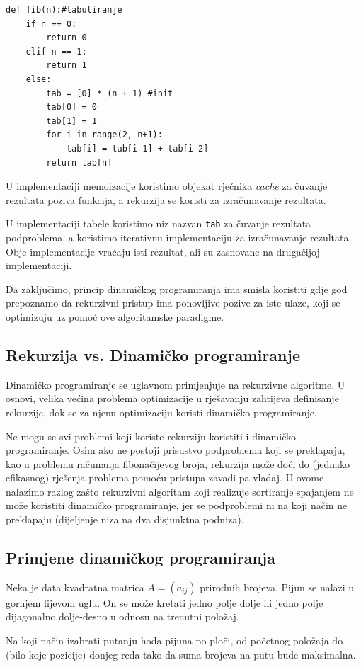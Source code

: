 \begin{verbatim}  
def fib(n):#tabuliranje
	if n == 0:
		return 0
	elif n == 1:
		return 1
	else:
		tab = [0] * (n + 1) #init
		tab[0] = 0
		tab[1] = 1
		for i in range(2, n+1):
			tab[i] = tab[i-1] + tab[i-2]
		return tab[n]
\end{verbatim}
U implementaciji memoizacije koristimo objekat rječnika \textit{cache} za čuvanje rezultata poziva funkcija, a rekurzija se koristi za izračunavanje rezultata.

U implementaciji tabele koristimo niz nazvan \texttt{tab} za čuvanje rezultata podproblema, a koristimo iterativnu implementaciju za izračunavanje rezultata. Obje implementacije vraćaju isti rezultat, ali su zasnovane na drugačijoj implementaciji. %

Da zaključimo, princip dinamičkog programiranja ima smisla koristiti gdje god prepoznamo da rekurzivni pristup ima ponovljive pozive za iste ulaze, koji se optimizuju uz pomoć ove algoritamske paradigme.

\subsection{Rekurzija vs. Dinamičko programiranje}


Dinamičko programiranje se uglavnom primjenjuje na rekurzivne algoritme.  U  osnovi, velika većina problema optimizacije u rješavanju zahtijeva definisanje rekurzije, dok se za njenu  optimizaciju koristi dinamičko programiranje.

Ne mogu se svi problemi koji koriste rekurziju koristiti i dinamičko programiranje. Osim ako ne postoji prisustvo podproblema koji se preklapaju,  kao u problemu računanja fibonačijevog broja, rekurzija može doći do (jednako efikasnog) rješenja problema pomoću pristupa zavadi pa vladaj. U ovome nalazimo  razlog zašto rekurzivni algoritam koji realizuje  sortiranje spajanjem ne može koristiti dinamičko programiranje, jer se podproblemi ni na koji način ne preklapaju (dijeljenje niza na dva disjunktna podniza).


\subsection{Primjene dinamičkog programiranja}

\begin{example}
	Neka je data kvadratna matrica $A=(a_{ij})$ prirodnih brojeva. Pijun se nalazi u gornjem lijevom uglu. On se može kretati jedno polje dolje ili jedno polje dijagonalno dolje-desno u odnosu na trenutni položaj. 
	
	
	Na koji način izabrati putanju hoda pijuna po ploči, od početnog položaja do (bilo koje pozicije) donjeg reda tako da suma brojeva na putu bude maksimalna.
\end{example}


